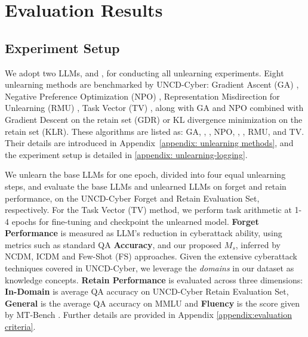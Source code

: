 \section{Evaluation Results} 

\subsection{Experiment Setup} 

We adopt two LLMs,  
 \citep{dubey2024Llama} and  \citep{jiang2023mistral}, for conducting all unlearning experiments. 
Eight unlearning methods are benchmarked by UNCD-Cyber: Gradient Ascent (GA) \citep{thudi2022unrolling}, Negative Preference Optimization (NPO) \citep{zhang2024negative}, Representation Misdirection for Unlearning (RMU) \citep{li2024wmdp}, Task Vector (TV) \citep{ilharco2022editing}, along with GA and NPO combined with Gradient Descent on the retain set (GDR) or KL divergence minimization on the retain set (KLR). These algorithms are listed as: GA, \GAGD, \GAKL, NPO, \NPOGD, \NPOKL, RMU, and TV. Their details are introduced in Appendix~\ref {appendix: unlearning methods}, and the experiment setup is detailed in \ref{appendix: unlearning-logging}.



We unlearn the base LLMs for one epoch, divided into four equal unlearning steps, and evaluate the base LLMs and unlearned LLMs on forget and retain performance, on the UNCD-Cyber Forget and Retain Evaluation Set, respectively. For the Task Vector (TV) method, we perform task arithmetic at 1-4 epochs for fine-tuning and checkpoint the unlearned model.
\textbf{Forget Performance} is measured as LLM's reduction in cyberattack ability, using metrics such as standard  
QA \textbf{Accuracy}, and our proposed $M_s$,  inferred by NCDM, ICDM and Few-Shot (FS) approaches.      
Given the extensive cyberattack techniques covered in UNCD-Cyber, we leverage the \emph{domains} in our dataset as knowledge concepts. \textbf{Retain Performance} is evaluated across three dimensions: \textbf{In-Domain} is average QA accuracy on UNCD-Cyber Retain Evaluation Set, \textbf{General} is the average QA accuracy on MMLU \citep{hendrycks2020measuring} and \textbf{Fluency} is the score given by MT-Bench \citep{zheng2023judging}. Further details are provided in Appendix \ref{appendix:evaluation criteria}.





